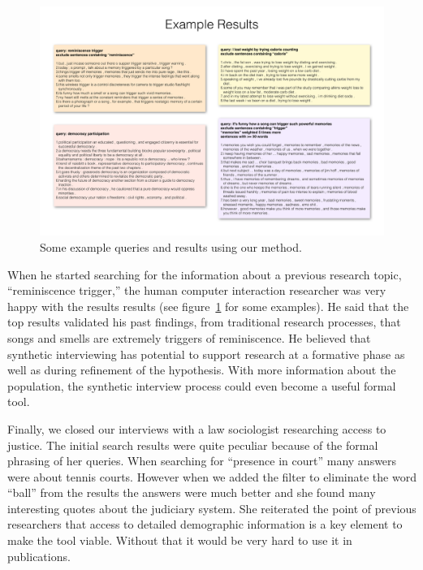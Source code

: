 \documentclass{sigchi}
\begin{document}
\begin{figure}[ht!]
\centering \includegraphics[width=\textwidth]{figures/results_2} 
\caption{Some example queries and results using our method.  \label{fig:reminiscenceTriggers}}
\end{figure}

When he started searching for the information about a previous research topic, ``reminiscence trigger,'' the human computer interaction researcher was very happy with the results results (see figure~\ref{fig:reminiscenceTriggers} for some examples). He said that the top results validated his past findings, from traditional research processes, that songs and smells are extremely triggers of reminiscence. He believed that synthetic interviewing has potential to support research at a formative phase as well as during refinement of the hypothesis. With more information about the population, the synthetic interview process could even become a useful formal tool.

Finally, we closed our interviews with a law sociologist researching access to justice. The initial search results were quite peculiar because of the formal phrasing of her queries. When searching for ``presence in court'' many answers were about tennis courts. However when we added the filter to eliminate the word ``ball'' from the results the answers were much better and she found many interesting quotes about the judiciary system. She reiterated the point of previous researchers that access to detailed demographic information is a key element to make the tool viable. Without that it would be very hard to use it in publications.

\end{document}
